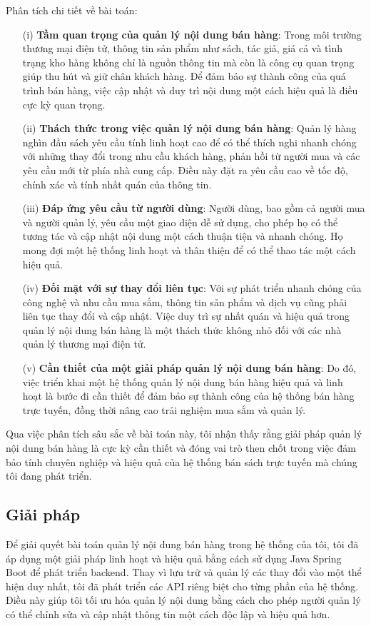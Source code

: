\documentclass[../DoAn.tex]{subfiles}
\begin{document}
Phân tích chi tiết về bài toán:
\begin{enumerate}
    \item[(i)] \textbf{Tầm quan trọng của quản lý nội dung bán hàng}: Trong môi trường thương mại điện tử, thông tin sản phẩm như sách, tác giả, giá cả và tình trạng kho hàng không chỉ là nguồn thông tin mà còn là công cụ quan trọng giúp thu hút và giữ chân khách hàng. Để đảm bảo sự thành công của quá trình bán hàng, việc cập nhật và duy trì nội dung một cách hiệu quả là điều cực kỳ quan trọng.
    \item[(ii)] \textbf{Thách thức trong việc quản lý nội dung bán hàng}: Quản lý hàng nghìn đầu sách yêu cầu tính linh hoạt cao để có thể thích nghi nhanh chóng với những thay đổi trong nhu cầu khách hàng, phản hồi từ người mua và các yêu cầu mới từ phía nhà cung cấp. Điều này đặt ra yêu cầu cao về tốc độ, chính xác và tính nhất quán của thông tin.
    \item[(iii)] \textbf{Đáp ứng yêu cầu từ người dùng}: Người dùng, bao gồm cả người mua và người quản lý, yêu cầu một giao diện dễ sử dụng, cho phép họ có thể tương tác và cập nhật nội dung một cách thuận tiện và nhanh chóng. Họ mong đợi một hệ thống linh hoạt và thân thiện để có thể thao tác một cách hiệu quả.
    \item[(iv)] \textbf{Đối mặt với sự thay đổi liên tục}: Với sự phát triển nhanh chóng của công nghệ và nhu cầu mua sắm, thông tin sản phẩm và dịch vụ cũng phải liên tục thay đổi và cập nhật. Việc duy trì sự nhất quán và hiệu quả trong quản lý nội dung bán hàng là một thách thức không nhỏ đối với các nhà quản lý thương mại điện tử.
    \item[(v)] \textbf{Cần thiết của một giải pháp quản lý nội dung bán hàng}: Do đó, việc triển khai một hệ thống quản lý nội dung bán hàng hiệu quả và linh hoạt là bước đi cần thiết để đảm bảo sự thành công của hệ thống bán hàng trực tuyến, đồng thời nâng cao trải nghiệm mua sắm và quản lý.
\end{enumerate}
Qua việc phân tích sâu sắc về bài toán này, tôi nhận thấy rằng giải pháp quản lý nội dung bán hàng là cực kỳ cần thiết và đóng vai trò then chốt trong việc đảm bảo tính chuyên nghiệp và hiệu quả của hệ thống bán sách trực tuyến mà chúng tôi đang phát triển.
\subsection{Giải pháp}
Để giải quyết bài toán quản lý nội dung bán hàng trong hệ thống của tôi, tôi đã áp dụng một giải pháp linh hoạt và hiệu quả bằng cách sử dụng Java Spring Boot để phát triển backend. Thay vì lưu trữ và quản lý các thay đổi vào một thể hiện duy nhất, tôi đã phát triển các API riêng biệt cho từng phần của hệ thống. Điều này giúp tôi tối ưu hóa quản lý nội dung bằng cách cho phép người quản lý có thể chỉnh sửa và cập nhật thông tin một cách độc lập và hiệu quả hơn.
\end{document}
